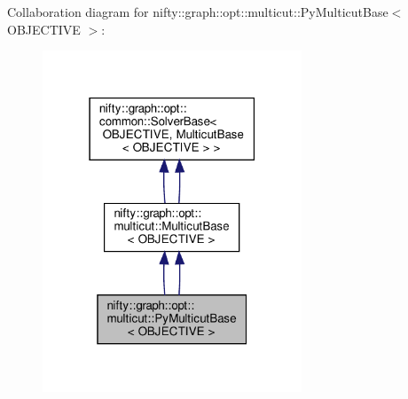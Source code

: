 Collaboration diagram for nifty\+:\+:graph\+:\+:opt\+:\+:multicut\+:\+:Py\+Multicut\+Base$<$ O\+B\+J\+E\+C\+T\+I\+VE $>$\+:
\nopagebreak
\begin{figure}[H]
\begin{center}
\leavevmode
\includegraphics[width=219pt]{classnifty_1_1graph_1_1opt_1_1multicut_1_1PyMulticutBase__coll__graph}
\end{center}
\end{figure}
